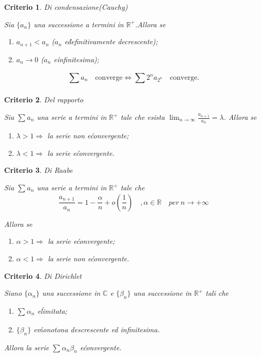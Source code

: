 \documentclass[a4paper, titlepage]{report}%
\theoremstyle{definition} %
\theoremstyle{plain}
\theoremstyle{plain}
\theoremstyle{remark}
\theoremstyle{remark}
\theoremstyle{plain}
\newtheorem*{criterio}{Criterio}
\theoremstyle{plain}
\theoremstyle{plain}
\theoremstyle{plain}
\theoremstyle{plain}
\begin{document}
\begin{criterio}{Di condensazione(Cauchy)}

    Sia $\{a_n\}$ una successione a termini in $\mathbb{R}^+$.Allora se
  \begin{enumerate}
    \item $a_{n+1}<a_n$ ($a_n $ e\' definitivamente decrescente);
    \item $a_n \rightarrow 0$ ($a_n$ e\' infinitesima);
  \end{enumerate}
\[
    \sum_{}^{}a_n \quad \text{converge}  \Longleftrightarrow \sum_{}^{}2^na_{2^n} 
    \quad \text{converge}.
\]
\end{criterio}
\begin{criterio}{Del rapporto}
    
    Sia $\sum_{}^{}a_n$ una serie a termini in $\mathbb{R}^+$ tale che
    esista $\lim_{n \to \infty} \frac{a_{n+1}}{a_n} = \lambda$.
    Allora se 
    \begin{enumerate}
        \item $\lambda>1 \Longrightarrow $ la serie non e\' convergente;
        \item $\lambda<1 \Longrightarrow $ la serie e\' convergente.
    \end{enumerate}
\end{criterio}
\begin{criterio}{Di Raabe}
    
    Sia $\sum_{}^{}a_n$ una serie a termini in $\mathbb{R}^+$ tale che
\[
        \frac{a_{n+1}}{a_n} = 1 - \frac{\alpha}{n} + o(\frac{1}{n}) 
        \quad , \alpha \in \mathbb{R} \quad per \ n \rightarrow +\infty
\]

    Allora se 
    \begin{enumerate}
        \item $\alpha>1 \Longrightarrow $ la serie e\' convergente;
        \item $\alpha<1 \Longrightarrow $ la serie non e\' convergente.
    \end{enumerate}
\end{criterio}
\begin{criterio}{Di Dirichlet}
    
    Siano $\{\alpha_n\}$ una successione in $\mathbb{C}$ e $\{ \beta_n\}$ una successione in $\mathbb{R}^+$ tali che
    \begin{enumerate}
        \item $\sum_{}^{}\alpha_n$ e\' limitata;
        \item $\{ \beta_n\}$ e\' monotona descrescente ed infinitesima.
    \end{enumerate}

    Allora la serie $\sum_{}^{}\alpha_n\beta_n$ e\' convergente.
\end{criterio}
    
\end{document}
